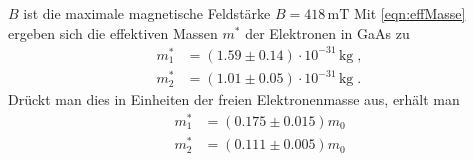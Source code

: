 $B$ ist die maximale magnetische Feldstärke $B=418\, \unit{\milli \tesla}$
Mit \autoref{eqn:effMasse} ergeben sich die effektiven Massen $m^*$ der Elektronen in GaAs zu 
\begin{align*}
    m^*_1 &= (1.59 \pm 0.14)\cdot 10^{-31}\,\unit{\kilogram}\; ,\\
    m^*_2&= (1.01 \pm 0.05)\cdot 10^{-31}\,\unit{\kilogram} \; .
\end{align*}
Drückt man dies in Einheiten der freien Elektronenmasse aus, erhält man
\begin{align*}
    m^*_1&= (0.175\pm 0.015) m_0\\
    m^*_2&= (0.111\pm 0.005) m_0
\end{align*}